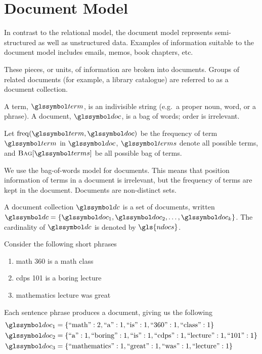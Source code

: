 \section{Document Model}
\label{sec:document-model}
	In contrast to the relational model, the document model represents semi-structured as well as unstructured data.  Examples of information suitable to the document model includes emails, memos, book chapters, etc.
	
	These pieces, or units, of information are broken into documents.  Groups of related documents (for example, a library catalogue) are referred to as a document collection.

	\begin{defn}
	\label{def:document}
		A term, \(\term\), is an indivisible string (e.g.~a proper noun, word, or a phrase).	A document, \(\doc\), is a bag of words; order is irrelevant.
		
		Let \(\freq(\term, \doc)\) be the frequency of term \(\term\) in \(\doc\), \(\terms\) denote all possible terms, and \(\bag{\terms}\) be all possible bag of terms.
	\end{defn}
	
	\begin{remark}
		We use the bag-of-words model for documents.  This means that position information of terms in a document is irrelevant, but the frequency of terms are kept in the document.  Documents are non-distinct sets.
	\end{remark}
	
	\begin{defn}
	\label{def:document-collection}
		A document collection \(\dc\) is a set of documents, written \(\dc = \{\doc_1, \doc_2, \dotsc, \doc_k\}\).  The cardinality of \(\dc\) is denoted by \(\gls{ndocs}\).
	\end{defn}
	
	\begin{ex}
	\label{ex:documents}
		Consider the following short phrases
		
		\begin{enumerate}
			\item math 360 is a math class
			\item cdps 101 is a boring lecture
			\item mathematics lecture was great
		\end{enumerate}
		
		Each sentence phrase produces a document, giving us the following
		\begin{align}
			\doc_1 &= \{\text{``math''}: 2, \text{``a''}: 1, \text{``is''}: 1, \text{``360''}: 1, \text{``class''}: 1\} \\
			\doc_2 &= \{\text{``a''}: 1, \text{``boring''}: 1, \text{``is''}: 1, \text{``cdps''}: 1, \text{``lecture''}: 1, \text{``101''}: 1\} \\
			\doc_3 &= \{\text{``mathematics''}: 1, \text{``great''}: 1, \text{``was''}: 1, \text{``lecture''}: 1\}
		\end{align}
	\end{ex}
	
